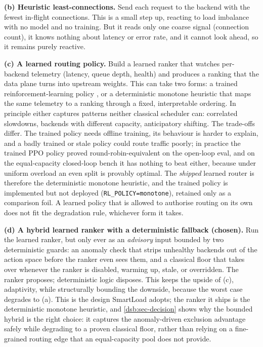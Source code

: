 \textbf{(b) Heuristic least-connections.} Send each request to the backend with
the fewest in-flight connections. This is a small step up, reacting to load
imbalance with no model and no training. But it reads only one coarse signal
(connection count), it knows nothing about latency or error rate, and it cannot
look ahead, so it remains purely reactive.

\textbf{(c) A learned routing policy.} Build a learned ranker that watches
per-backend telemetry (latency, queue depth, health) and produces a ranking that
the data plane turns into upstream weights. This can take two forms: a trained
reinforcement-learning policy \cite{sutton2018rl,schulman2017ppo,raffin2021sb3},
or a deterministic monotone heuristic that maps the same telemetry to a ranking
through a fixed, interpretable ordering. In principle either captures patterns
neither classical scheduler can: correlated slowdowns, backends with different
capacity, anticipatory shifting. The trade-offs differ. The trained policy needs
offline training, its behaviour is harder to explain, and a badly trained or stale
policy could route traffic poorly; in practice the trained PPO policy proved
round-robin-equivalent on the open-loop eval, and on the equal-capacity closed-loop
bench it has nothing to beat either, because under uniform overload an even split is
provably optimal. The \emph{shipped} learned router is therefore the deterministic
monotone heuristic, and the trained policy is implemented but not deployed
(\texttt{RL\_POLICY=monotone}), retained only as a comparison foil. A
learned policy that is allowed to authorise routing on its own does not fit the
degradation rule, whichever form it takes.

\textbf{(d) A hybrid learned ranker with a deterministic fallback (chosen).}
Run the learned ranker, but only ever as an \emph{advisory} input bounded by two
deterministic guards: an anomaly check that strips unhealthy backends out of the
action space before the ranker even sees them, and a classical floor that takes
over whenever the ranker is disabled, warming up, stale, or overridden. The ranker
proposes; deterministic logic disposes. This keeps the upside of (c), adaptivity,
while structurally bounding the downside, because the worst case degrades to (a).
This is the design SmartLoad adopts; the ranker it ships is the deterministic
monotone heuristic, and \cref{dsb:sec-decision} shows why the bounded hybrid is the
right choice: it captures the anomaly-driven exclusion advantage safely while degrading
to a proven classical floor, rather than relying on a fine-grained routing edge that an
equal-capacity pool does not provide.

